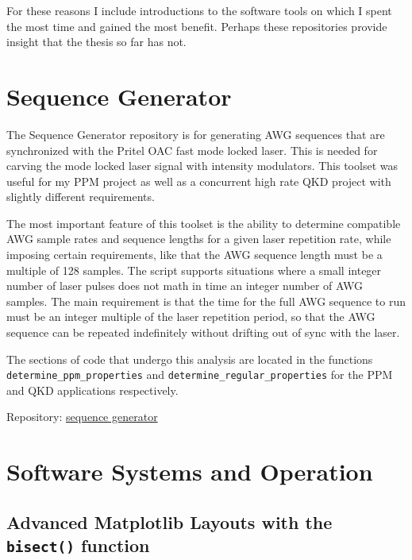 \documentclass[11pt]{caltech_thesis} %
\begin{document}
For these reasons I include introductions to the software tools on which
I spent the most time and gained the most benefit. Perhaps these
repositories provide insight that the thesis so far has not.

\hypertarget{sequence-generator}{%
\section{Sequence Generator}\label{sequence-generator}}

The Sequence Generator repository is for generating AWG sequences that
are synchronized with the Pritel OAC fast mode locked laser. This is
needed for carving the mode locked laser signal with intensity
modulators. This toolset was useful for my PPM project as well as a
concurrent high rate QKD project with slightly different requirements.

The most important feature of this toolset is the ability to determine
compatible AWG sample rates and sequence lengths for a given laser
repetition rate, while imposing certain requirements, like that the AWG
sequence length must be a multiple of 128 samples. The script supports
situations where a small integer number of laser pulses does not math in
time an integer number of AWG samples. The main requirement is that the
time for the full AWG sequence to run must be an integer multiple of the
laser repetition period, so that the AWG sequence can be repeated
indefinitely without drifting out of sync with the laser.

The sections of code that undergo this analysis are located in the
functions \texttt{determine\_ppm\_properties} and
\texttt{determine\_regular\_properties} for the PPM and QKD applications
respectively.

Repository:
\href{https://github.com/sansseriff/sequence_generator/tree/main}{sequence
generator}

\hypertarget{section}{%
\section{}\label{section}}

\hypertarget{software-systems-and-operation}{%
\section{Software Systems and
Operation}\label{software-systems-and-operation}}

\hypertarget{advanced-matplotlib-layouts-with-the-bisect-function}{%
\subsection{\texorpdfstring{Advanced Matplotlib Layouts with the
\texttt{bisect()}
function}{Advanced Matplotlib Layouts with the bisect() function}}\label{advanced-matplotlib-layouts-with-the-bisect-function}}
\end{document}
